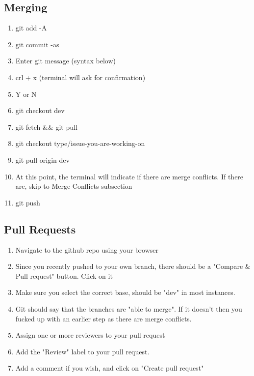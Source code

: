 \documentclass{article}
\begin{document}
		\subsection{Merging}
			\begin{enumerate}
				\item git add -A
				\item git commit -as
				\item Enter git message (syntax below)
				\item crl + x (terminal will ask for confirmation)
				\item Y or N
				\item git checkout dev
				\item git fetch \&\& git pull
				\item git checkout type/issue-you-are-working-on
				\item git pull origin dev
				\item At this point, the terminal will indicate if there are merge conflicts. If there are, skip to Merge Conflicts subsection
				\item git push
			\end{enumerate}
		\subsection{Pull Requests}
			\begin{enumerate}
				\item Navigate to the github repo using your browser
				\item Since you recently pushed to your own branch, there should be a "Compare \& Pull request" button. Click on it
				\item Make sure you select the correct base, should be "dev" in most instances.
				\item Git should say that the branches are "able to merge". If it doesn't then you fucked up with an earlier step as there are merge conflicts.
				\item Assign one or more reviewers to your pull request
				\item Add the "Review" label to your pull request.
				\item Add a comment if you wish, and click on "Create pull request"
			\end{enumerate}
\end{document}
